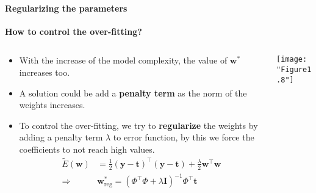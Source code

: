 \begin{frame}{\insertsubsection}
\begin{columns}
\begin{column}{0.475\textwidth}
\begin{animateinline}{5}
				\newframe
			 \end{animateinline}
		\end{column}
	\end{columns}
\end{frame}

\begin{frame}{\insertsubsection}
	\framesubtitle{Regularizing the parameters}
	\textcolor{UniGold}{\textbf{How to control the over-fitting?}}
	\begin{columns}
		\begin{column}{0.475\textwidth}
			\begin{itemize}	
			\item With the increase of the model complexity, the value of $\mathbf{w}^*$ increases too.
			\item A solution could be add a \textcolor{UniOrange}{\textbf{penalty term}} as the norm of the weights increases.
			\item To control the over-fitting, we try to \textcolor{UniOrange}{\textbf{regularize}} the weights by adding a penalty term $\lambda$ to error function, by this we force the coefficients to not reach high values.
			\begin{align*}
				\tilde{E}(\mathbf{w}) &=\frac{1}{2} (\mathbf{y}-\mathbf{t})^{\top}(\mathbf{y}-\mathbf{t}) +\frac{\lambda}{2} \mathbf{w}^{\top}\mathbf{w} \\
		\Rightarrow & \mathbf{w}^*_\text{reg} = \left( \Phi^{\top} \Phi + \lambda \mathbf{I} \right)^{-1} \Phi^{\top} \mathbf{t}
	\end{align*}			
			\end{itemize}
		\end{column}
		\begin{column}{0.475\textwidth}  %
			\centering
			\texttt{[image: "Figure1.8"]}
		\end{column}
	\end{columns}
\end{frame}


